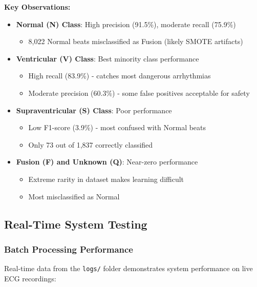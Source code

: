 \documentclass[12pt,a4paper]{article}
\begin{document}
\textbf{Key Observations:}
\begin{itemize}
    \item \textbf{Normal (N) Class}: High precision (91.5\%), moderate recall (75.9\%)
    \begin{itemize}
        \item 8,022 Normal beats misclassified as Fusion (likely SMOTE artifacts)
    \end{itemize}
    
    \item \textbf{Ventricular (V) Class}: Best minority class performance
    \begin{itemize}
        \item High recall (83.9\%) - catches most dangerous arrhythmias
        \item Moderate precision (60.3\%) - some false positives acceptable for safety
    \end{itemize}
    
    \item \textbf{Supraventricular (S) Class}: Poor performance
    \begin{itemize}
        \item Low F1-score (3.9\%) - most confused with Normal beats
        \item Only 73 out of 1,837 correctly classified
    \end{itemize}
    
    \item \textbf{Fusion (F) and Unknown (Q)}: Near-zero performance
    \begin{itemize}
        \item Extreme rarity in dataset makes learning difficult
        \item Most misclassified as Normal
    \end{itemize}
\end{itemize}

\subsection{Real-Time System Testing}

\subsubsection{Batch Processing Performance}

Real-time data from the \texttt{logs/} folder demonstrates system performance on live ECG recordings:
\end{document}
